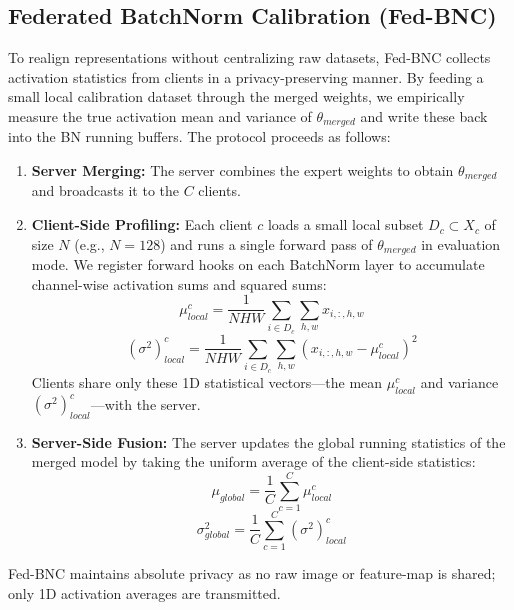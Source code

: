 \documentclass{article}
\theoremstyle{plain}
\theoremstyle{definition}
\theoremstyle{remark}
\begin{document}
\subsection{Federated BatchNorm Calibration (Fed-BNC)}
To realign representations without centralizing raw datasets, Fed-BNC collects activation statistics from clients in a privacy-preserving manner. By feeding a small local calibration dataset through the merged weights, we empirically measure the true activation mean and variance of $\theta_{merged}$ and write these back into the BN running buffers. The protocol proceeds as follows:
\begin{enumerate}
    \item \textbf{Server Merging:} The server combines the expert weights to obtain $\theta_{merged}$ and broadcasts it to the $C$ clients.
    \item \textbf{Client-Side Profiling:} Each client $c$ loads a small local subset $D_c \subset X_c$ of size $N$ (e.g., $N\!=\!128$) and runs a single forward pass of $\theta_{merged}$ in evaluation mode. We register forward hooks on each BatchNorm layer to accumulate channel-wise activation sums and squared sums:
    \begin{equation}
        \mu_{local}^c = \frac{1}{NHW} \sum_{i \in D_c} \sum_{h, w} x_{i, :, h, w}
    \end{equation}
    \begin{equation}
        (\sigma^2)_{local}^c = \frac{1}{NHW} \sum_{i \in D_c} \sum_{h, w} (x_{i, :, h, w} - \mu_{local}^c)^2
    \end{equation}
    Clients share only these 1D statistical vectors---the mean $\mu_{local}^c$ and variance $(\sigma^2)_{local}^c$---with the server.
    \item \textbf{Server-Side Fusion:} The server updates the global running statistics of the merged model by taking the uniform average of the client-side statistics:
    \begin{equation}
        \mu_{global} = \frac{1}{C} \sum_{c=1}^C \mu_{local}^c
    \end{equation}
    \begin{equation}
        \sigma_{global}^2 = \frac{1}{C} \sum_{c=1}^C (\sigma^2)_{local}^c
    \end{equation}
\end{enumerate}
Fed-BNC maintains absolute privacy as no raw image or feature-map is shared; only 1D activation averages are transmitted.
\end{document}
